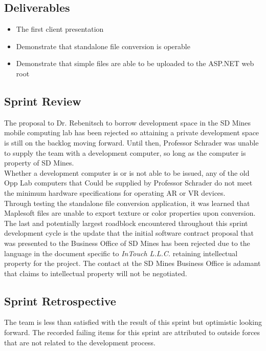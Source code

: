     \subsection{Deliverables}
    \label{sec:Sprint2_deliverables}
    \begin{itemize}
        \item The first client presentation
        \item Demonstrate that standalone file conversion is operable
        \item Demonstrate that simple files are able to be uploaded to the ASP.NET web root
    \end{itemize}

    \subsection{Sprint Review}
    \label{sec:Sprint2_review}
        \hspace{7mm}
        The proposal to Dr. Rebenitsch to borrow development space in the SD Mines mobile computing lab has
        been rejected so attaining a private development space is still on the backlog moving forward.  Until
        then, Professor Schrader was unable to supply the team with a development computer, so long as the
        computer is property of SD Mines.\\

        Whether a development computer is or is not able to be issued, any of the old Opp Lab computers that Could
        be supplied by Professor Schrader do not meet the minimum hardware specifications for operating AR or VR
        devices.\\

        Through testing the standalone file conversion application, it was learned that Maplesoft files are unable
        to export texture or color properties upon conversion.\\

        The last and potentially largest roadblock encountered throughout this sprint development cycle is the 
        update that the initial software contract proposal that was presented to the Business Office of SD Mines
        has been rejected due to the language in the document specific to 
        \textit{InTouch L.L.C.} 
        retaining intellectual property for the project.  The contact at the SD Mines Business Office is adamant that 
        claims to intellectual property will not be negotiated.

    \subsection{Sprint Retrospective}
    \label{sec:Sprint2_retrospective}
        \hspace{7mm}
        The team is less than satisfied with the result of this sprint but optimistic looking forward.  The
        recorded failing items for this sprint are attributed to outside forces that are not related to the 
        development process.\\

